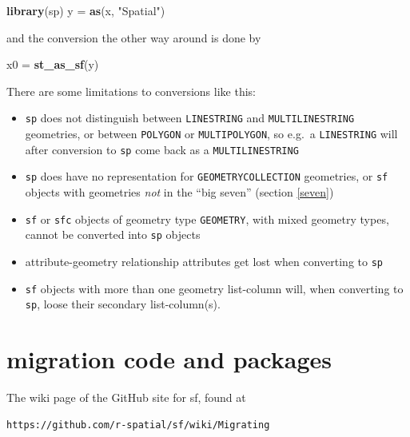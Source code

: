 \documentclass[]{book}
\newenvironment{Shaded}{\begin{snugshade}}{\end{snugshade}}
\newcommand{\KeywordTok}[1]{\textcolor[rgb]{0.13,0.29,0.53}{\textbf{#1}}}
\newcommand{\NormalTok}[1]{#1}
\newcommand{\StringTok}[1]{\textcolor[rgb]{0.31,0.60,0.02}{#1}}
\providecommand{\tightlist}{%
  \setlength{\itemsep}{0pt}\setlength{\parskip}{0pt}}
\begin{document}
\begin{Shaded}
\begin{Highlighting}[]
\KeywordTok{library}\NormalTok{(sp)}
\NormalTok{y =}\StringTok{ }\KeywordTok{as}\NormalTok{(x, }\StringTok{"Spatial"}\NormalTok{)}
\end{Highlighting}
\end{Shaded}

and the conversion the other way around is done by

\begin{Shaded}
\begin{Highlighting}[]
\NormalTok{x0 =}\StringTok{ }\KeywordTok{st_as_sf}\NormalTok{(y)}
\end{Highlighting}
\end{Shaded}

There are some limitations to conversions like this:

\begin{itemize}
\tightlist
\item
  \texttt{sp} does not distinguish between \texttt{LINESTRING} and
  \texttt{MULTILINESTRING} geometries, or between \texttt{POLYGON} or \texttt{MULTIPOLYGON},
  so e.g.~a \texttt{LINESTRING} will after conversion to \texttt{sp} come back as a
  \texttt{MULTILINESTRING}
\item
  \texttt{sp} does have no representation for \texttt{GEOMETRYCOLLECTION}
  geometries, or \texttt{sf} objects with geometries \emph{not} in the ``big seven''
  (section \ref{seven})
\item
  \texttt{sf} or \texttt{sfc} objects of geometry type \texttt{GEOMETRY}, with mixed
  geometry types, cannot be converted into \texttt{sp} objects
\item
  attribute-geometry relationship attributes get lost when converting
  to \texttt{sp}
\item
  \texttt{sf} objects with more than one geometry list-column will, when
  converting to \texttt{sp}, loose their secondary list-column(s).
\end{itemize}

\hypertarget{migration-code-and-packages}{%
\section{migration code and packages}\label{migration-code-and-packages}}

The wiki page of the GitHub site for sf, found at

\begin{verbatim}
https://github.com/r-spatial/sf/wiki/Migrating
\end{verbatim}
\end{document}
